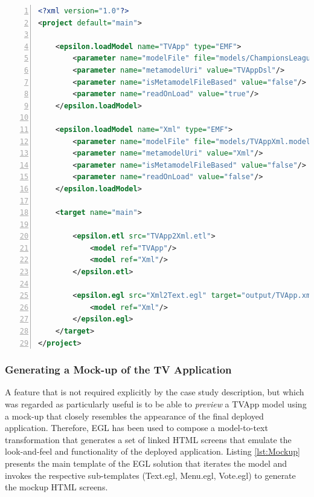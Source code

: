 \begin{lstlisting}[basicstyle=\ttfamily\footnotesize, nolol=true, numbers=left, flexiblecolumns=true, caption=The workflow that integrates the ETL and EGL tasks, tabsize=2, label=lst:CaseStudyCodeGenWorkflow, language=XML]
<?xml version="1.0"?>
<project default="main">
	
	<epsilon.loadModel name="TVApp" type="EMF">
		<parameter name="modelFile" file="models/ChampionsLeague.model"/>
		<parameter name="metamodelUri" value="TVAppDsl"/>
		<parameter name="isMetamodelFileBased" value="false"/>
		<parameter name="readOnLoad" value="true"/>
	</epsilon.loadModel>
	
	<epsilon.loadModel name="Xml" type="EMF">
		<parameter name="modelFile" file="models/TVAppXml.model"/>
		<parameter name="metamodelUri" value="Xml"/>
		<parameter name="isMetamodelFileBased" value="false"/> 
		<parameter name="readOnLoad" value="false"/>
	</epsilon.loadModel>

	<target name="main">

		<epsilon.etl src="TVApp2Xml.etl">
			<model ref="TVApp"/>
			<model ref="Xml"/>
		</epsilon.etl>
		
		<epsilon.egl src="Xml2Text.egl" target="output/TVApp.xml">
			<model ref="Xml"/>
		</epsilon.egl>
	</target>
</project>
\end{lstlisting}

\subsubsection{Generating a Mock-up of the TV Application}
\label{sec:Mockup}

A feature that is not required explicitly by the case study description, but which was regarded as particularly useful is to be able to \textit{preview} a TVApp model using a mock-up that closely resembles the appearance of the final deployed application. Therefore, EGL has been used to compose a model-to-text transformation that generates a set of linked HTML screens that emulate the look-and-feel and functionality of the deployed application. Listing \ref{lst:Mockup} presents the main template of the EGL solution that iterates the model and invokes the respective sub-templates (Text.egl, Menu.egl, Vote.egl) to generate the mockup HTML screens.

